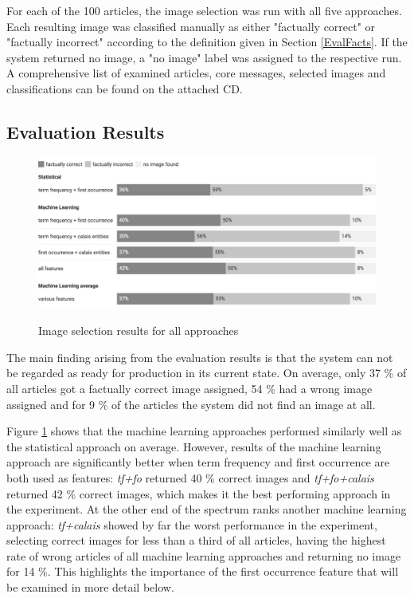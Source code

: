 \documentclass[11pt,a4paper,twoside]{article}
\begin{document}
For each of the 100 articles, the image selection was run with all five approaches. Each resulting image was classified manually as either "factually correct" or "factually incorrect" according to the definition given in Section \ref{EvalFacts}. If the system returned no image, a "no image" label was assigned to the respective run. A comprehensive list of examined articles, core messages, selected images and classifications can be found on the attached CD.

\subsection{Evaluation Results} \label{EvalResults}

\begin{figure}[t]
    \caption{Image selection results for all approaches}
    \centering
    \includegraphics[width=\columnwidth]{fig-results-overview.png}
    \label{fig:results-overview}
\end{figure}

The main finding arising from the evaluation results is that the system can not be regarded as ready for production in its current state. On average, only 37 \% of all articles got a factually correct image assigned, 54 \% had a wrong image assigned and for 9 \% of the articles the system did not find an image at all.

Figure \ref{fig:results-overview} shows that the machine learning approaches performed similarly well as the statistical approach on average. However, results of the machine learning approach are significantly better when term frequency and first occurrence are both used as features: \emph{tf+fo} returned 40 \% correct images and \emph{tf+fo+calais} returned 42 \% correct images, which makes it the best performing approach in the experiment. At the other end of the spectrum ranks another machine learning approach: \emph{tf+calais} showed by far the worst performance in the experiment, selecting correct images for less than a third of all articles, having the highest rate of wrong articles of all machine learning approaches and returning no image for 14 \%. This highlights the importance of the first occurrence feature that will be examined in more detail below.
\end{document}
